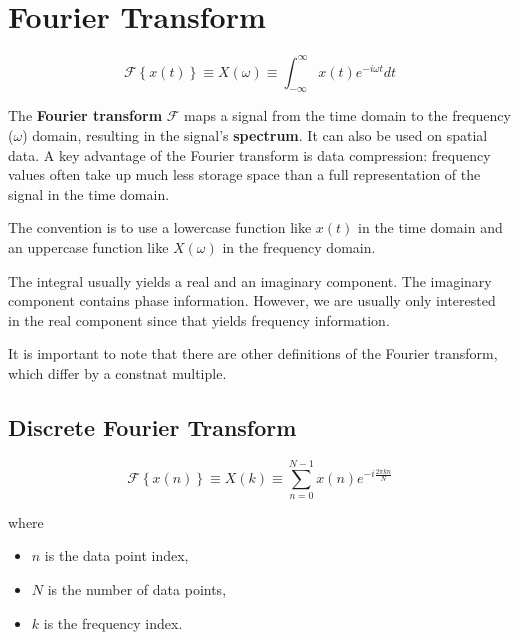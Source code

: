 \section{Fourier Transform}

\begin{equation*}
    \mathcal{F}\left\{x(t)\right\} \equiv X(\omega) \equiv \int_{-\infty}^{\infty} x(t) e^{-i\omega t} dt
\end{equation*}

The \textbf{Fourier transform} $\mathcal{F}$ maps a signal from the time domain to the frequency ($\omega$) domain, resulting in the signal's \textbf{spectrum}. It can also be used on spatial data. A key advantage of the Fourier transform is data compression: frequency values often take up much less storage space than a full representation of the signal in the time domain.

\vsp

The convention is to use a lowercase function like $x(t)$ in the time domain and an uppercase function like $X(\omega)$ in the frequency domain.

\vsp

The integral usually yields a real and an imaginary component. The imaginary component contains phase information. However, we are usually only interested in the real component since that yields frequency information.

\vsp

It is important to note that there are other definitions of the Fourier transform, which differ by a constnat multiple.

\subsection{Discrete Fourier Transform}

\begin{equation*}
    \mathcal{F}\left\{x(n)\right\} \equiv X(k) \equiv \sum_{n = 0}^{N-1} x(n) e^{-i\frac{2\pi kn}{N}}
\end{equation*}

where

\begin{itemize}
    \item $n$ is the data point index,
    \item $N$ is the number of data points,
    \item $k$ is the frequency index.
\end{itemize}

\vsp

